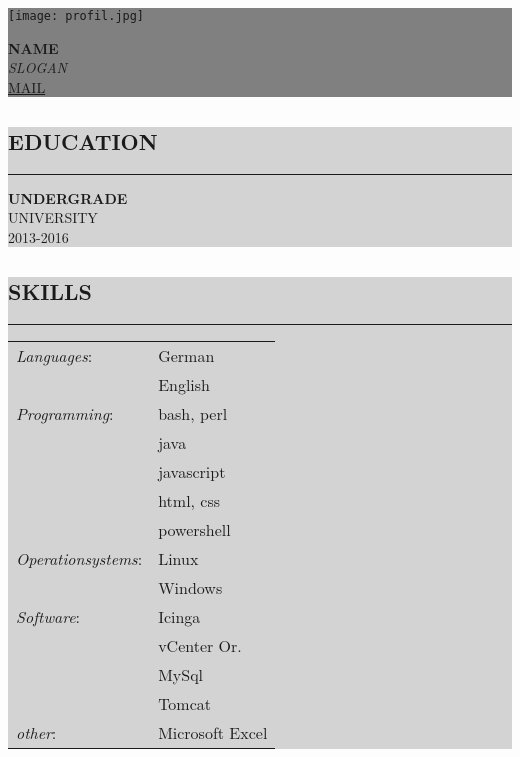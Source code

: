 \documentclass[12pt, a4paper, titlepage]{article}
\newcommand{\mybox}[2]{\par\noindent\colorbox{#1}
{\parbox{\dimexpr\textwidth-2\fboxsep\relax}{#2}}}
\begin{document}
\clearpage

\mybox{grey}{
	\begin{minipage}{.38\textwidth}
		\texttt{[image: profil.jpg]} 
	\end{minipage}
	\begin{minipage}{.62\textwidth}
		\textbf{\huge NAME} \\ 
		\textit{\large SLOGAN} \\
		\href{mailto:mail@mail.mail}{MAIL}
	\end{minipage}
}
\begin{minipage}[t]{.38\textwidth}
	\vspace{0pt}
	\begin{flushleft}
		
		\mybox{lightGrey}{
			\subsection*{EDUCATION}
			\hrule
			\vskip2mm
			\textbf{UNDERGRADE} \\
			UNIVERSITY \\
			2013-2016
		}
		
		\mybox{lightGrey}{
		\subsection*{SKILLS}
		\hrule
		\vskip2mm
		\begin{tabular}{l l}
			\textit{Languages}: & German \\
			 & English \\
			\textit{Programming}: & bash, perl \\
			 & java \\
			 & javascript \\
			 & html, css \\
			 & powershell \\
			\textit{Operationsystems}: & Linux \\
			 & Windows \\
			\textit{Software}: & Icinga \\
			& vCenter Or. \\
			& MySql \\
			& Tomcat \\
			\textit{other}: & Microsoft Excel \\
		\end{tabular}
		}
		
	\end{flushleft} 
\end{minipage}
\end{document}
